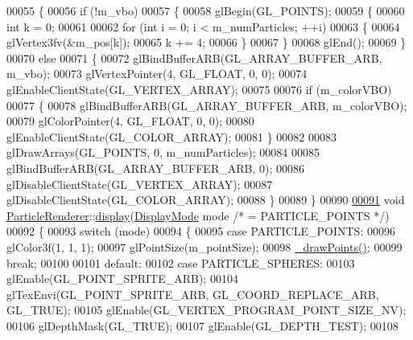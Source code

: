 \begin{DoxyCode}
00055 \{
00056     \textcolor{keywordflow}{if} (!m\_vbo)
00057     \{
00058         glBegin(GL\_POINTS);
00059         \{
00060             \textcolor{keywordtype}{int} k = 0;
00061 
00062             \textcolor{keywordflow}{for} (\textcolor{keywordtype}{int} i = 0; i < m\_numParticles; ++i)
00063             \{
00064                 glVertex3fv(&m\_pos[k]);
00065                 k += 4;
00066             \}
00067         \}
00068         glEnd();
00069     \}
00070     \textcolor{keywordflow}{else}
00071     \{
00072         glBindBufferARB(GL\_ARRAY\_BUFFER\_ARB, m\_vbo);
00073         glVertexPointer(4, GL\_FLOAT, 0, 0);
00074         glEnableClientState(GL\_VERTEX\_ARRAY);
00075 
00076         \textcolor{keywordflow}{if} (m\_colorVBO)
00077         \{
00078             glBindBufferARB(GL\_ARRAY\_BUFFER\_ARB, m\_colorVBO);
00079             glColorPointer(4, GL\_FLOAT, 0, 0);
00080             glEnableClientState(GL\_COLOR\_ARRAY);
00081         \}
00082 
00083         glDrawArrays(GL\_POINTS, 0, m\_numParticles);
00084 
00085         glBindBufferARB(GL\_ARRAY\_BUFFER\_ARB, 0);
00086         glDisableClientState(GL\_VERTEX\_ARRAY);
00087         glDisableClientState(GL\_COLOR\_ARRAY);
00088     \}
00089 \}
00090 
\hypertarget{render__particles_8cpp_source_l00091}{}\hyperlink{class_particle_renderer_a80b2f52dc28bb3abbde021f7fe96f8ff}{00091} \textcolor{keywordtype}{void} \hyperlink{class_particle_renderer}{ParticleRenderer}::\hyperlink{class_particle_renderer_a80b2f52dc28bb3abbde021f7fe96f8ff}{display}(\hyperlink{class_particle_renderer_a7b691afffd1abe415cb0ce17fd26f3d5}{DisplayMode} mode \textcolor{comment}{/* =
       PARTICLE\_POINTS */})
00092 \{
00093     \textcolor{keywordflow}{switch} (mode)
00094     \{
00095         \textcolor{keywordflow}{case} PARTICLE\_POINTS:
00096             glColor3f(1, 1, 1);
00097             glPointSize(m\_pointSize);
00098             \hyperlink{class_particle_renderer_a2683c43c010bff7973a977c1953f2bd6}{\_drawPoints}\hyperlink{class_particle_renderer_a2683c43c010bff7973a977c1953f2bd6}{(}\hyperlink{class_particle_renderer_a2683c43c010bff7973a977c1953f2bd6}{)};
00099             \textcolor{keywordflow}{break};
00100 
00101         \textcolor{keywordflow}{default}:
00102         \textcolor{keywordflow}{case} PARTICLE\_SPHERES:
00103             glEnable(GL\_POINT\_SPRITE\_ARB);
00104             glTexEnvi(GL\_POINT\_SPRITE\_ARB, GL\_COORD\_REPLACE\_ARB, GL\_TRUE);
00105             glEnable(GL\_VERTEX\_PROGRAM\_POINT\_SIZE\_NV);
00106             glDepthMask(GL\_TRUE);
00107             glEnable(GL\_DEPTH\_TEST);
00108 

\end{DoxyCode}
